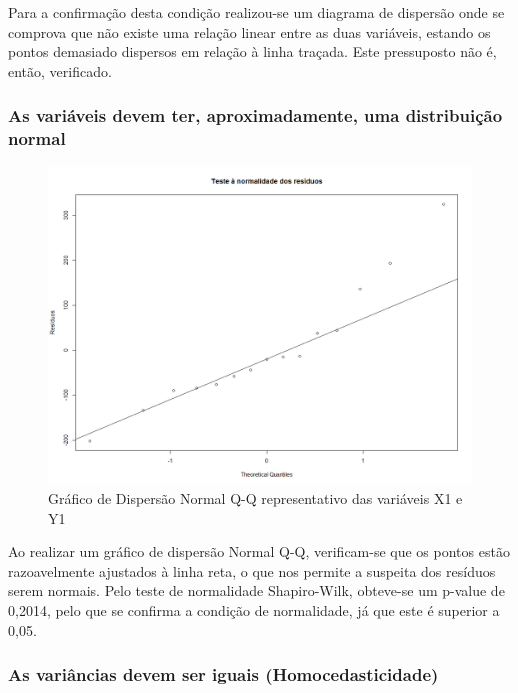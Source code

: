 \documentclass[conference]{IEEEtran}
\begin{document}
Para a confirmação desta condição realizou-se um diagrama de dispersão onde se comprova que não existe uma relação linear entre as duas variáveis, estando os pontos demasiado dispersos em relação à linha traçada. Este pressuposto não é, então, verificado.

\subsubsection{As variáveis devem ter, aproximadamente, uma distribuição normal}

\begin{figure}[htbp]
\centerline{\includegraphics[width=0.95\columnwidth]{images/03.a.3.png}}
\caption{Gráfico de Dispersão Normal Q-Q representativo das variáveis X1 e Y1}
\label{fig}
\end{figure}

Ao realizar um gráfico de dispersão Normal Q-Q, verificam-se que os pontos estão razoavelmente ajustados à linha reta, o que nos permite a suspeita dos resíduos serem normais. Pelo teste de normalidade Shapiro-Wilk, obteve-se um p-value de 0,2014, pelo que se confirma a condição de normalidade, já que este é superior a 0,05.

\subsubsection{As variâncias devem ser iguais (Homocedasticidade)}
\end{document}
